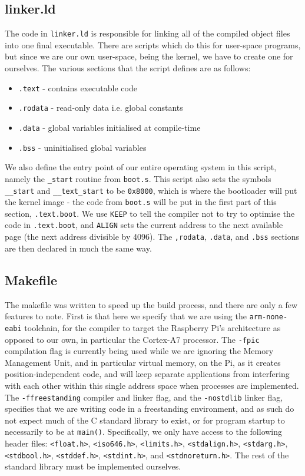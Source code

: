 \documentclass[10pt,a4paper]{article}
\newcommand{\code}[1]{\texttt{#1}}
\begin{document}
\subsection{linker.ld}
The code in \code{linker.ld} is responsible for linking all of the compiled
object files into one final executable. There are scripts which do this for
user-space programs, but since we are our own user-space, being the kernel, we
have to create one for ourselves. The various sections that the script defines
are as follows:
\begin{itemize}
    \itemsep0em
    \item \code{.text} - contains executable code
    \item \code{.rodata} - read-only data i.e. global constants
    \item \code{.data} - global variables initialised at compile-time
    \item \code{.bss} - uninitialised global variables
\end{itemize}

We also define the entry point of our entire operating system in this script,
namely the \code{\_start} routine from \code{boot.s}. This script also sets the
symbols \code{\_\_start} and \code{\_\_text\_start} to be \code{0x8000}, which
is where the bootloader will put the kernel image - the code from \code{boot.s}
will be put in the first part of this section, \code{.text.boot}. We use
\code{KEEP} to tell the compiler not to try to optimise the code in
\code{.text.boot}, and \code{ALIGN} sets the current address to the next
available page (the next address divisible by 4096). The \code{,rodata},
\code{.data}, and \code{.bss} sections are then declared in much the same way.

\subsection{Makefile}
The makefile was written to speed up the build process, and there are only a few
features to note. First is that here we specify that we are using the
\code{arm-none-eabi} toolchain, for the compiler to target the Raspberry Pi's
architecture as opposed to our own, in particular the Cortex-A7 processor. The
\code{-fpic} compilation flag is currently being used while we are ignoring the
Memory Management Unit, and in particular virtual memory, on the Pi, as it
creates position-independent code, and will keep separate applications from
interfering with each other within this single address space when processes are
implemented. The \code{-ffreestanding} compiler and linker flag, and the
\code{-nostdlib} linker flag, specifies that we are writing code in a
freestanding environment, and as such do not expect much of the C standard
library to exist, or for program startup to necessarily to be at \code{main()}.
Specifically, we only have access to the following header files:
\code{<float.h>}, \code{<iso646.h>}, \code{<limits.h>}, \code{<stdalign.h>},
\code{<stdarg.h>}, \code{<stdbool.h>}, \code{<stddef.h>}, \code{<stdint.h>}, and
\code{<stdnoreturn.h>}. The rest of the standard library must be implemented
ourselves.
\end{document}
